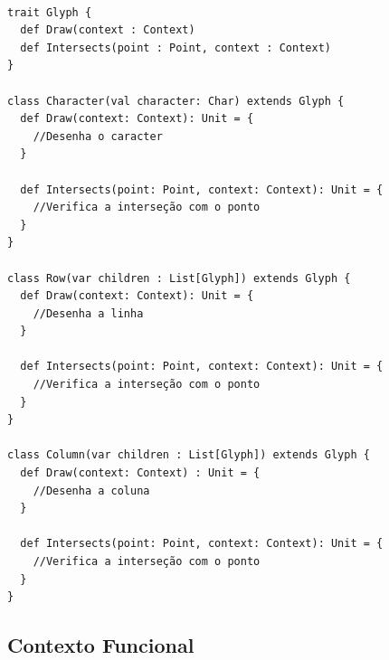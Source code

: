 \begin{lstlisting}[caption={Flyweight Orientado a Objetos},label=ooflyweight]

trait Glyph {
  def Draw(context : Context)
  def Intersects(point : Point, context : Context)
}

class Character(val character: Char) extends Glyph {
  def Draw(context: Context): Unit = {
    //Desenha o caracter
  }

  def Intersects(point: Point, context: Context): Unit = {
    //Verifica a interseção com o ponto
  }
}

class Row(var children : List[Glyph]) extends Glyph {
  def Draw(context: Context): Unit = {
    //Desenha a linha
  }

  def Intersects(point: Point, context: Context): Unit = {
    //Verifica a interseção com o ponto
  }
}

class Column(var children : List[Glyph]) extends Glyph {
  def Draw(context: Context) : Unit = {
    //Desenha a coluna
  }

  def Intersects(point: Point, context: Context): Unit = {
    //Verifica a interseção com o ponto
  }
}

\end{lstlisting}

\subsection*{Contexto Funcional}

\begin{lstlisting}[caption={Flyweight Funcional},label=fpflyweight]
    

    
\end{lstlisting}